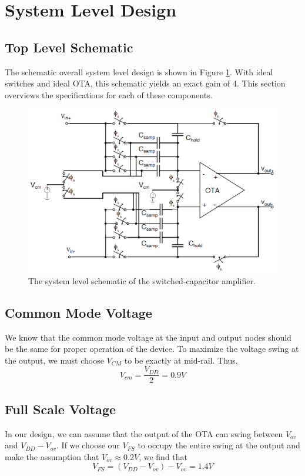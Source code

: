 \documentclass[journal]{IEEEtran}
\begin{document}
\section{System Level Design}
\subsection{Top Level Schematic}
The schematic overall system level design is shown in Figure \ref{fig:system_level_schem}. With ideal switches and ideal OTA, this schematic yields an exact gain of 4. This section overviews the specifications for each of these components.

\begin{figure}
\centering
\includegraphics[width=5in]{Schematics/system_level_schem.png}
\caption{The system level schematic of the switched-capacitor amplifier.}
\label{fig:system_level_schem}
\end{figure}

\subsection{Common Mode Voltage}
We know that the common mode voltage at the input and output nodes should be the same for proper operation of the device. To maximize the voltage swing at the output, we must choose $V_{CM}$ to be exactly at mid-rail. Thus,
\begin{equation}
V_{cm}=\frac{V_{DD}}{2}=0.9V
\end{equation}

\subsection{Full Scale Voltage}
In our design, we can assume that the output of the OTA can swing between $V_{ov}$ and $V_{DD}-V_{ov}$. If we choose our $V_{FS}$ to occupy the entire swing at the output and make the assumption that $V_{ov}\approx 0.2V$, we find that
\begin{equation}
V_{FS} = \left(V_{DD} - V_{ov}\right) - V_{ov} = 1.4V
\end{equation}
\end{document}
